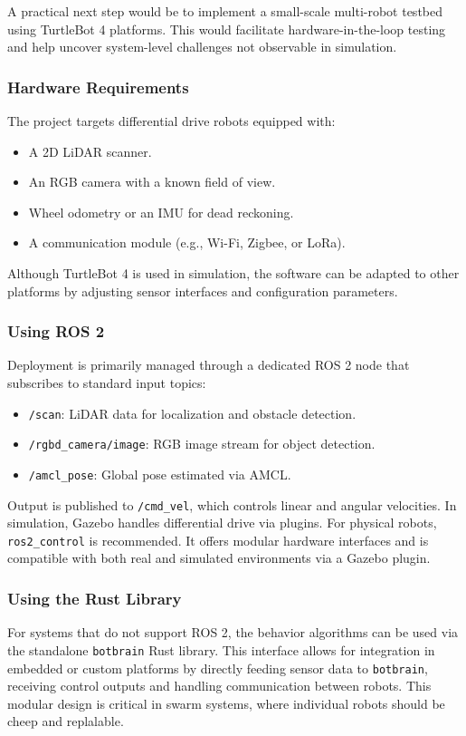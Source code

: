 A practical next step would be to implement a small-scale multi-robot testbed using TurtleBot 4 platforms. This would facilitate hardware-in-the-loop testing and help uncover system-level challenges not observable in simulation.

\subsubsection{Hardware Requirements}
The project targets differential drive robots equipped with:
\begin{itemize}
  \item A 2D LiDAR scanner.
  \item An RGB camera with a known field of view.
  \item Wheel odometry or an IMU for dead reckoning.
  \item A communication module (e.g., Wi-Fi, Zigbee, or LoRa).
\end{itemize}
Although TurtleBot 4 is used in simulation, the software can be adapted to other platforms by adjusting sensor interfaces and configuration parameters.

\subsubsection{Using ROS 2}
Deployment is primarily managed through a dedicated ROS 2 node that subscribes to standard input topics:
\begin{itemize}
  \item \texttt{/scan}: LiDAR data for localization and obstacle detection.
  \item \texttt{/rgbd\_camera/image}: RGB image stream for object detection.
  \item \texttt{/amcl\_pose}: Global pose estimated via AMCL.
\end{itemize}

Output is published to \texttt{/cmd\_vel}, which controls linear and angular velocities. In simulation, Gazebo handles differential drive via plugins. For physical robots, \texttt{ros2\_control} \cite{ros2-control} is recommended. It offers modular hardware interfaces and is compatible with both real and simulated environments via a Gazebo plugin.

\subsubsection{Using the Rust Library}
For systems that do not support ROS 2, the behavior algorithms can be used via the standalone \texttt{botbrain} Rust library. This interface allows for integration in embedded or custom platforms by directly feeding sensor data to \texttt{botbrain}, receiving control outputs and handling communication between robots. This modular design is critical in swarm systems, where individual robots should be cheep and replalable.

